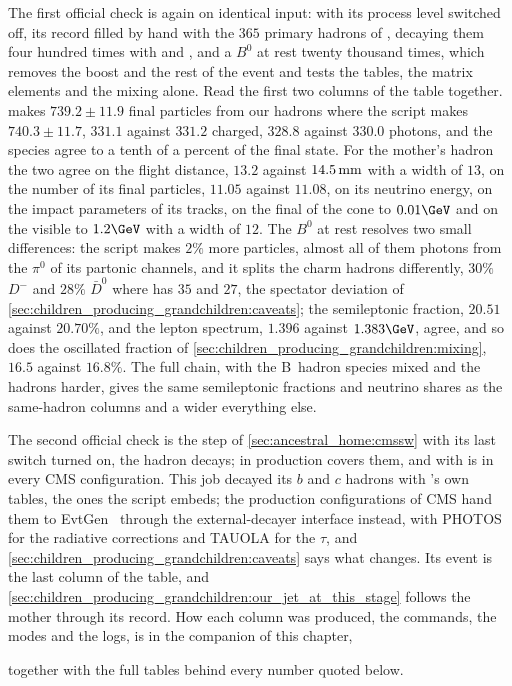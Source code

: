 The first official check is again on identical input: \PYTHIA with its
process level switched off, its record filled by hand with the $365$
primary hadrons of , decaying them four hundred times
with  and , and a
$B^0$ at rest twenty thousand times, which removes the boost and the rest
of the event and tests the tables, the matrix elements and the mixing
alone. Read the first two columns of the table together. \PYTHIA makes
$739.2\pm11.9$ final particles from our hadrons where the script makes
$740.3\pm11.7$, $331.1$ against $331.2$ charged, $328.8$ against $330.0$
photons, and the species agree to a tenth of a percent of the final state.
For the mother's hadron the two agree on the flight distance, $13.2$
against $14.5\,\mathrm{mm}$ with a width of $13$, on the number of its final
particles, $11.05$ against $11.08$, on its neutrino energy, on the impact
parameters of its tracks, on the final \pt of the cone to $0.01\GeV$ and
on the visible \pt to $1.2\GeV$ with a width of $12$. The $B^0$ at rest
resolves two small differences: the script makes $2\%$ more particles,
almost all of them photons from the $\pi^0$ of its partonic channels, and
it splits the charm hadrons differently, $30\%$ $D^-$ and $28\%$
$\bar D^0$ where \PYTHIA has $35$ and $27$, the spectator deviation of
\cref{sec:children_producing_grandchildren:caveats}; the semileptonic fraction,
$20.51$ against $20.70\%$, and the lepton spectrum, $1.396$ against
$1.383\GeV$, agree, and so does the oscillated fraction of
\cref{sec:children_producing_grandchildren:mixing}, $16.5$ against
$16.8\%$. The full chain, with the B~hadron species mixed and
the hadrons harder, gives the same semileptonic fractions and neutrino
shares as the same-hadron columns and a wider everything else.
\label{sec:children_producing_grandchildren:cmssw}

The second official check is the  step of
\cref{sec:ancestral_home:cmssw} with its last switch turned on, the hadron
decays; in production  covers them, and
 with  is in every
CMS configuration. This job decayed its $b$ and $c$ hadrons with \PYTHIA's
own tables, the ones the script embeds; the production configurations of
CMS hand them to EvtGen~\cite{Lange:2001uf} through the external-decayer
interface instead, with PHOTOS for the radiative corrections and TAUOLA for
the $\tau$, and \cref{sec:children_producing_grandchildren:caveats} says what changes. Its event is the
last column of the table, and \cref{sec:children_producing_grandchildren:our_jet_at_this_stage} follows
the mother through its record. How each column was produced, the commands,
the modes and the logs, is in the companion of this chapter,
\begin{center}
\end{center}
together with the full tables behind every number quoted below.

